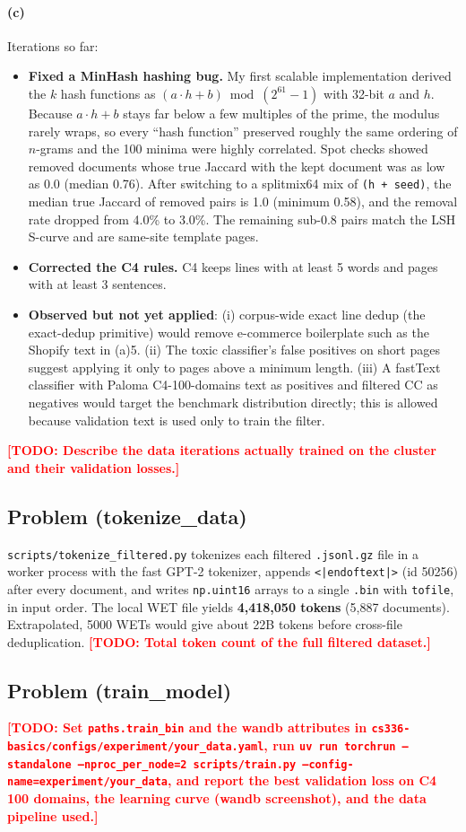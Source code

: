 \documentclass[11pt]{article}
\newcommand{\todo}[1]{\textcolor{red}{\textbf{[TODO: #1]}}}
\begin{document}
\paragraph{(c)} Iterations so far:
\begin{itemize}
  \item \textbf{Fixed a MinHash hashing bug.} My first scalable implementation derived the $k$ hash functions as
  $(a\cdot h + b) \bmod (2^{61}-1)$ with 32-bit $a$ and $h$. Because $a\cdot h + b$ stays far below a few multiples of the prime,
  the modulus rarely wraps, so every ``hash function'' preserved roughly the same ordering of $n$-grams and the 100 minima
  were highly correlated. Spot checks showed removed documents whose true Jaccard with the kept document was as low as 0.0
  (median 0.76). After switching to a splitmix64 mix of \texttt{(h + seed)}, the median true Jaccard of removed pairs is 1.0
  (minimum 0.58), and the removal rate dropped from 4.0\% to 3.0\%. The remaining sub-0.8 pairs match the LSH S-curve and are
  same-site template pages.
  \item \textbf{Corrected the C4 rules.} C4 keeps lines with at least 5 words and pages with at least 3 sentences.
  \item \textbf{Observed but not yet applied}: (i) corpus-wide exact line dedup (the exact-dedup primitive) would remove
  e-commerce boilerplate such as the Shopify text in (a)5. (ii) The toxic classifier's false positives on short pages suggest
  applying it only to pages above a minimum length. (iii) A fastText classifier with Paloma C4-100-domains text as positives and
  filtered CC as negatives would target the benchmark distribution directly; this is allowed because validation text is used
  only to train the filter.
\end{itemize}
\todo{Describe the data iterations actually trained on the cluster and their validation losses.}

\subsection*{Problem (tokenize\_data)}
\texttt{scripts/tokenize\_filtered.py} tokenizes each filtered \texttt{.jsonl.gz} file in a worker process
with the fast GPT-2 tokenizer, appends \texttt{<|endoftext|>} (id 50256) after every document, and writes
\texttt{np.uint16} arrays to a single \texttt{.bin} with \texttt{tofile}, in input order. The local WET
file yields \textbf{4{,}418{,}050 tokens} (5{,}887 documents). Extrapolated, 5000 WETs would give about 22B tokens
before cross-file deduplication.
\todo{Total token count of the full filtered dataset.}

\subsection*{Problem (train\_model)}
\todo{Set \texttt{paths.train\_bin} and the wandb attributes in \texttt{cs336-basics/configs/experiment/your\_data.yaml}, run
\texttt{uv run torchrun --standalone --nproc\_per\_node=2 scripts/train.py --config-name=experiment/your\_data}, and report the
best validation loss on C4 100 domains, the learning curve (wandb screenshot), and the data pipeline used.}
\end{document}
